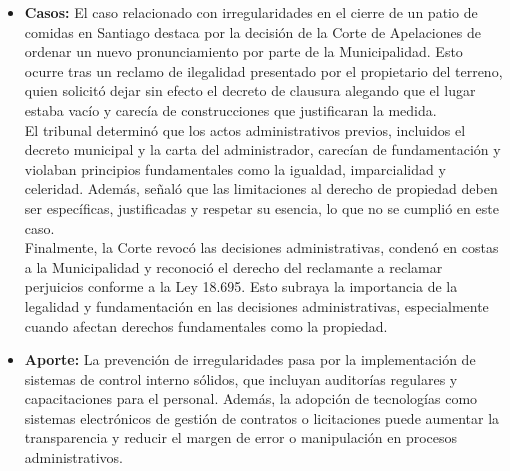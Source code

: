 \documentclass[letter,12pt]{article}
\begin{document}
\begin{itemize}
		\item \textbf{Casos: }El caso relacionado con irregularidades en el cierre de un patio de comidas en Santiago destaca por la decisión de la Corte de Apelaciones de ordenar un nuevo pronunciamiento por parte de la Municipalidad. Esto ocurre tras un reclamo de ilegalidad presentado por el propietario del terreno, quien solicitó dejar sin efecto el decreto de clausura alegando que el lugar estaba vacío y carecía de construcciones que justificaran la medida.\\ El tribunal determinó que los actos administrativos previos, incluidos el decreto municipal y la carta del administrador, carecían de fundamentación y violaban principios fundamentales como la igualdad, imparcialidad y celeridad. Además, señaló que las limitaciones al derecho de propiedad deben ser específicas, justificadas y respetar su esencia, lo que no se cumplió en este caso.\\ Finalmente, la Corte revocó las decisiones administrativas, condenó en costas a la Municipalidad y reconoció el derecho del reclamante a reclamar perjuicios conforme a la Ley 18.695. Esto subraya la importancia de la legalidad y fundamentación en las decisiones administrativas, especialmente cuando afectan derechos fundamentales como la propiedad.\\
		
		\item \textbf{Aporte: }La prevención de irregularidades pasa por la implementación de sistemas de control interno sólidos, que incluyan auditorías regulares y capacitaciones para el personal. Además, la adopción de tecnologías como sistemas electrónicos de gestión de contratos o licitaciones puede aumentar la transparencia y reducir el margen de error o manipulación en procesos administrativos.\\
	\end{itemize}
	\newpage
	
\end{document}
